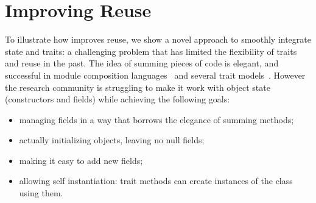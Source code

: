 \saveSpace\saveSpace\section{Improving Reuse}\saveSpace




To illustrate how \name improves reuse,
we show a novel approach
to smoothly integrate state and traits: a challenging problem that has limited the flexibility of traits and
reuse in the past.
The idea of summing pieces of
code is elegant, and successful in module
composition languages~\cite{ancona2002calculus} and several trait
models~\cite{ducasse2006traits,Bergel2007,BETTINI2013521,fjig}.  However the research
community is struggling to make it work with object state (constructors
and fields) while achieving the following goals:

\begin{itemize}
\item managing fields in a way that borrows the elegance of summing methods;
\item actually initializing objects, leaving no null fields;
\item making it easy to add new fields;
\item allowing self instantiation: trait methods can create instances of the class using them.
\end{itemize}

